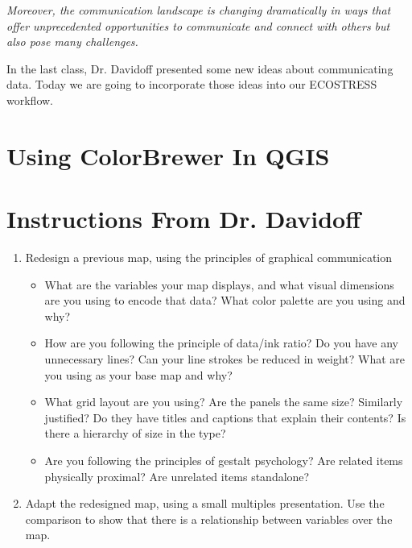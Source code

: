 \documentclass[oneside,a4paper,11pt,explicit]{book}
\begin{document}
{\begin{minipage}{.9665\textwidth}
	\vspace{.5em}

	\textit{Moreover, the communication landscape is changing dramatically in ways that offer unprecedented opportunities to communicate and connect with others but also pose many challenges.}

	\vspace{.5em}

	In the last class, Dr. Davidoff presented some new ideas about communicating data. Today we are going to incorporate those ideas into our ECOSTRESS workflow.
	
\end{minipage}}

\section{Using ColorBrewer In QGIS}

\section{Instructions From Dr. Davidoff}

\begin{enumerate}
	\item Redesign a previous map, using the principles of graphical communication
	\begin{itemize}
		\item What are the variables your map displays, and what visual dimensions are you using to encode that data? What color palette are you using and why?
		\item How are you following the principle of data/ink ratio? Do you have any unnecessary lines? Can your line strokes be reduced in weight? What are you using as your base map and why?
		\item What grid layout are you using? Are the panels the same size? Similarly justified? Do they have titles and captions that explain their contents? Is there a hierarchy of size in the type?
		\item Are you following the principles of gestalt psychology? Are related items physically proximal? Are unrelated items standalone?
	\end{itemize}
	\item Adapt the redesigned map, using a small multiples presentation. Use the comparison to show that there is a relationship between variables over the map.
\end{enumerate}
\end{document}
